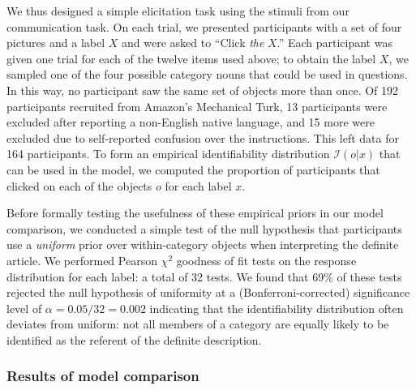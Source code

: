 \documentclass[11pt, floatsintext]{apa6}
\begin{document}
We thus designed a simple elicitation task using the stimuli from our communication task.
On each trial, we presented participants with a set of four pictures and a label $X$ and were asked to ``Click \emph{the} $X$.''
Each participant was given one trial for each of the twelve items used above; to obtain the label $X$, we sampled one of the four possible category nouns that could be used in questions. 
In this way, no participant saw the same set of objects more than once. 
Of 192 participants recruited from Amazon's Mechanical Turk, 13 participants were excluded after reporting a non-English native language, and 15 more were excluded due to self-reported confusion over the instructions. 
This left data for 164 participants.
To form an empirical identifiability distribution $\mathcal{I}(o | x)$ that can be used in the model, we computed the proportion of participants that clicked on each of the objects $o$ for each label $x$. 

Before formally testing the usefulness of these empirical priors in our model comparison, we conducted a simple test of the null hypothesis that participants use a \emph{uniform} prior over within-category objects when interpreting the definite article. 
We performed Pearson $\chi^2$ goodness of fit tests on the response distribution for each label: a total of 32 tests. 
We found that 69\% of these tests rejected the null hypothesis of uniformity at a (Bonferroni-corrected) significance level of $\alpha = 0.05/32 = 0.002$ indicating that the identifiability distribution often deviates from uniform: not all members of a category are equally likely to be identified as the referent of the definite description.

\subsubsection{Results of model comparison}

\end{document}
